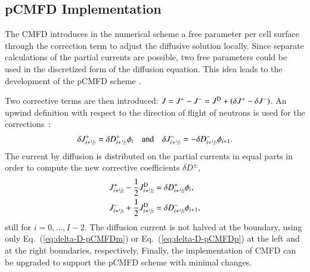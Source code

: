 \documentclass[review,3p,onecolumn,sort&compress]{elsarticle}
\newcommand{\eq}[1]{Eq.~(\ref{#1})}
\newcommand{\jp}{\ensuremath{J^+}}
\newcommand{\jm}{\ensuremath{J^-}}
\newcommand{\jpm}{\ensuremath{J^\pm}}
\newcommand{\jD}{\ensuremath{J^{\textrm{\scriptsize{D}}}}}
\newcommand{\hzi}{\ensuremath{\sfrac{1}{2}}}
\begin{document}
\subsection{pCMFD Implementation}
\label{sec:RM-pCMFD}

The CMFD introduces in the numerical scheme a free parameter per cell surface through the correction term to adjust the diffusive solution locally. Since separate calculations of the partial currents are possible, two free parameters could be used in the discretized form of the diffusion equation. This idea leads to the development of the pCMFD scheme \cite{cho2003comparison}.

Two corrective terms are then introduced: $J = \jp - \jm = \jD + \left(\delta J^+ - \delta J^-\right)$. An upwind definition with respect to the direction of flight of neutrons is used for the corrections~\cite{Jarrett-2016,Zhu-2016}:
\begin{equation}
\label{eq:CCF-sub}
\delta \jp _{i+\hzi} = \delta D^+ _{i+\hzi} \phi_i
\quad \text{and} \quad
\delta \jm _{i+\hzi} = -\delta D^- _{i+\hzi} \phi_{i+1}.
\end{equation}
The current by diffusion is distributed on the partial currents in equal parts in order to compute the new corrective coefficients $\delta D^{\pm}$,
\begin{subequations}
	\label{eq:delta-D-pCMFD}
	\begin{align}
	J^+_{i+\hzi} - \frac{1}{2}\jD_{i+\hzi} &= \delta D^+_{i+\hzi} \phi_i, \label{eq:delta-D-pCMFDp}\\
	J^-_{i+\hzi} + \frac{1}{2}\jD_{i+\hzi} &= \delta D^-_{i+\hzi} \phi_{i+1}, \label{eq:delta-D-pCMFDm}
	\end{align}
\end{subequations}
still for $i=0, \ldots, I-2$. The diffusion current is not halved at the boundary, using only \eq{eq:delta-D-pCMFDm} or \eq{eq:delta-D-pCMFDp} at the left and at the right boundaries, respectively. Finally, the implementation of CMFD can be upgraded to support the pCMFD scheme with minimal changes.
%
%
\end{document}
